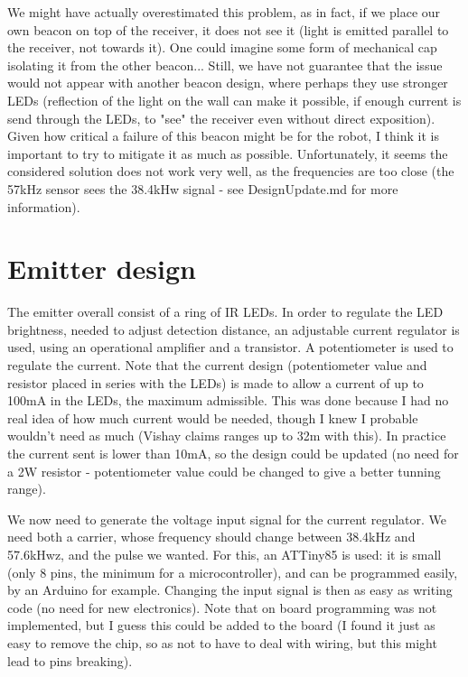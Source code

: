 \documentclass[a4paper,11pt]{article}
\begin{document}
 We might have actually overestimated this problem, as in fact, if we place our own beacon on top of the receiver, it does not see it (light is emitted parallel to the receiver, not towards it). One could imagine some form of mechanical cap isolating it from the other beacon... Still, we have not guarantee that the issue would not appear with another beacon design, where perhaps they use stronger LEDs (reflection of the light on the wall can make it possible, if enough current is send through the LEDs, to "see" the receiver even without direct exposition). Given how critical a failure of this beacon might be for the robot, I think it is important to try to mitigate it as much as possible. Unfortunately, it seems the considered solution does not work very well, as the frequencies are too close (the 57kHz sensor sees the 38.4kHw signal - see DesignUpdate.md for more information).

\section{Emitter design}

The emitter overall consist of a ring of IR LEDs. In order to regulate the LED brightness, needed to adjust detection distance, an adjustable current regulator is used, using an operational amplifier and a transistor. A potentiometer is used to regulate the current. Note that the current design (potentiometer value and resistor placed in series with the LEDs) is made to allow a current of up to 100mA in the LEDs, the maximum admissible. This was done because I had no real idea of how much current would be needed, though I knew I probable wouldn't need as much (Vishay claims ranges up to 32m with this). In practice the current sent is lower than 10mA, so the design could be updated (no need for a 2W resistor - potentiometer value could be changed to give a better tunning range).

We now need to generate the voltage input signal for the current regulator. We need both a carrier, whose frequency should change between 38.4kHz and 57.6kHwz, and the pulse we wanted. For this, an ATTiny85 is used: it is small (only 8 pins, the minimum for a microcontroller), and can be programmed easily, by an Arduino for example. Changing the input signal is then as easy as writing code (no need for new electronics). Note that on board programming was not implemented, but I guess this could be added to the board (I found it just as easy to remove the chip, so as not to have to deal with wiring, but this might lead to pins breaking).
\end{document}
